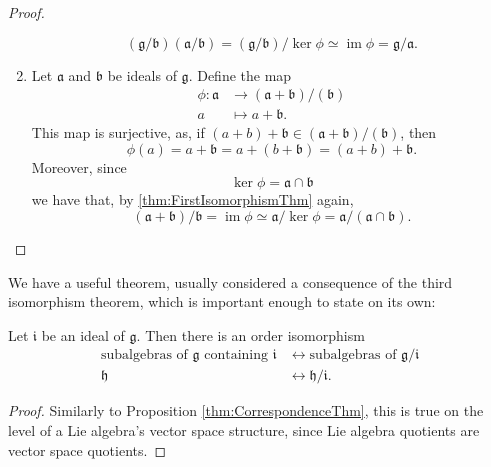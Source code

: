 \documentclass{article}
\DeclareMathOperator{\im}{im}
\newcommand*\frka{{\ensuremath{\mathfrak{a}}}}
\newcommand*\frkb{{\ensuremath{\mathfrak{b}}}}
\newcommand*\frkg{{\ensuremath{\mathfrak{g}}}}
\newcommand*\frkh{{\ensuremath{\mathfrak{h}}}}
\newcommand*\frki{{\ensuremath{\mathfrak{i}}}}
\begin{document}
\begin{proof}
\begin{enumerate}[label=(\alph*)]
            \[
                (\frkg/\frkb)(\frka/\frkb)
                =
                (\frkg/\frkb)/\ker\phi
                \simeq
                \im\phi
                =
                \frkg/\frka.
            \]
        \item 
            Let $\frka$ and $\frkb$ be ideals of $\frkg$.
            Define the map
            \begin{align*}
                \phi:
                \frka 
                &\to 
                (\frka+\frkb)/(\frkb)
                \\
                a
                &\mapsto
                a + \frkb.
            \end{align*}
            This map is surjective, as, if $(a + b) + \frkb \in (\frka+\frkb)/(\frkb)$, then
            \[
                \phi(a)
                =
                a + \frkb
                =
                a + (b + \frkb)
                =
                (a + b) + \frkb.
            \]
            Moreover, since
            \[
                \ker \phi
                =
                \frka \cap \frkb
            \]
            we have that, by \ref{thm:FirstIsomorphismThm} again,
            \[
                (\frka+\frkb)/\frkb
                =
                \im \phi
                \simeq
                \frka/\ker\phi
                =
                \frka/(\frka \cap \frkb).
            \]
    \end{enumerate}
\end{proof}

We have a useful theorem, usually considered a consequence of the third isomorphism theorem, which is important enough to state on its own:

\begin{theorem}
    \label{thm:CorrespondenceThm}
    Let $\frki$ be an ideal of $\frkg$.
    Then there is an order isomorphism  
    \begin{align*}
        \text{subalgebras of $\frkg$ containing $\frki$}
        &\leftrightarrow
        \text{subalgebras of $\frkg/\frki$}
        \\
        \frkh
        &\leftrightarrow
        \frkh/\frki.
    \end{align*}
\end{theorem}

\begin{proof}
    Similarly to Proposition \ref{thm:CorrespondenceThm}, this is true on the level of a Lie algebra's vector space structure, since Lie algebra quotients are vector space quotients.
\end{proof}
\end{document}
